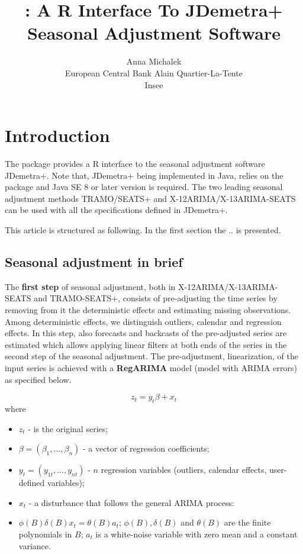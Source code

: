 \documentclass[article]{jss}
\author{
Anna Michalek\\European Central Bank \And Alain Quartier-La-Tente\\Insee
}
\title{\pkg{RJDemetra}: A R Interface To JDemetra+ Seasonal Adjustment Software}
\providecommand{\tightlist}{%
  \setlength{\itemsep}{0pt}\setlength{\parskip}{0pt}}
\begin{document}
\hypertarget{introduction}{%
\section{Introduction}\label{introduction}}

The package  provides a R interface to the seasonal
adjustment software JDemetra+. Note that, JDemetra+ being implemented in
Java,  relies on the  package and Java SE 8 or
later version is required. The two leading seasonal adjustment methods
TRAMO/SEATS+ and X-12ARIMA/X-13ARIMA-SEATS can be used with all the
specifications defined in JDemetra+.

This article is structured as following. In the first section the .. is
presented.

\hypertarget{seasonal-adjustment-in-brief}{%
\subsection{Seasonal adjustment in
brief}\label{seasonal-adjustment-in-brief}}

The \textbf{first step} of seasonal adjustment, both in
X-12ARIMA/X-13ARIMA-SEATS and TRAMO-SEATS+, consists of pre-adjusting
the time series by removing from it the deterministic effects and
estimating missing observations. Among deterministic effects, we
distinguish outliers, calendar and regression effects. In this step,
also forecasts and backcasts of the pre-adjusted series are estimated
which allows applying linear filters at both ends of the series in the
second step of the seasonal adjustment. The pre-adjustment,
linearization, of the input series is achieved with a \textbf{RegARIMA}
model (model with ARIMA errors) as specified below.

\[z_t=y_t\beta+x_t\] where

\begin{itemize}
\tightlist
\item
  \(z_t\) - is the original series;
\item
  \(\beta = (\beta_1,...,\beta_n)\) - a vector of regression
  coefficients;
\item
  \(y_t = (y_{1t},...,y_{nt})\) - \(n\) regression variables (outliers,
  calendar effects, user-defined variables);
\item
  \(x_t\) - a disturbance that follows the general ARIMA process:
\item
  \(\phi(B)\delta(B)x_t=\theta(B)a_t\); \(\phi(B), \delta(B)\) and
  \(\theta(B)\) are the finite polynomials in \(B\); \(a_t\) is a
  white-noise variable with zero mean and a constant variance.
\end{itemize}
\end{document}
